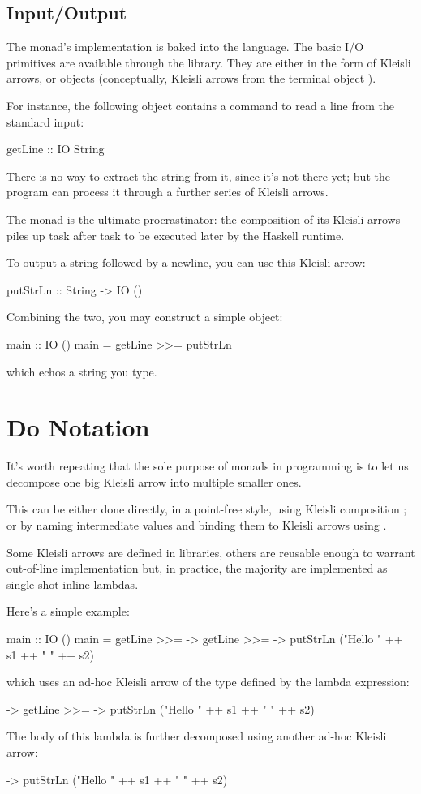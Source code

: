 \documentclass[DaoFP]{subfiles}
\begin{document}
\subsection{Input/Output}

The  monad's implementation is baked into the language. The basic I/O primitives are available through the library. They are either in the form of Kleisli arrows, or  objects (conceptually, Kleisli arrows from the terminal object \hask{()}). 

For instance, the following object contains a command to read a line from the standard input:
\begin{haskell}
getLine :: IO String
\end{haskell}
There is no way to extract the string from it, since it's not there yet; but the program can process it through a further series of Kleisli arrows. 

The  monad is the ultimate procrastinator: the composition of its Kleisli arrows piles up task after task to be executed later by the Haskell runtime.

To output a string followed by a newline, you can use this Kleisli arrow:
\begin{haskell}
putStrLn :: String -> IO ()
\end{haskell}
Combining the two, you may construct a simple  object:
\begin{haskell}
main :: IO ()
main = getLine >>= putStrLn
\end{haskell}
which echos a string you type.

\section{Do Notation}

It's worth repeating that the sole purpose of monads in programming is to let us decompose one big Kleisli arrow into multiple smaller ones. 

This can be either done directly, in a point-free style, using Kleisli composition \hask{<=<}; or by naming intermediate values and binding them to Kleisli arrows using \hask{>>=}. 

Some Kleisli arrows are defined in libraries, others are reusable enough to warrant out-of-line implementation but, in practice, the majority are implemented as single-shot inline lambdas.

Here's a simple example:
\begin{haskell}
main :: IO ()
main = 
  getLine >>=  ->
    getLine >>=  ->
      putStrLn ("Hello " ++ s1 ++ " " ++ s2)
\end{haskell}
which uses an ad-hoc Kleisli arrow of the type  defined by the lambda expression:
\begin{haskell}
 ->
    getLine >>=  ->
      putStrLn ("Hello " ++ s1 ++ " " ++ s2)
\end{haskell}
The body of this lambda is further decomposed using another ad-hoc Kleisli arrow:
\begin{haskell}
 -> putStrLn ("Hello " ++ s1 ++ " " ++ s2)
\end{haskell}
\end{document}
